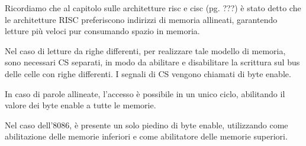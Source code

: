 \documentclass[../template]{subfiles}
\begin{document}
Ricordiamo che al capitolo sulle architetture risc e cisc (pg. ???) è stato detto che le architetture RISC preferiscono indirizzi di memoria allineati, garantendo letture più veloci pur consumando spazio in memoria.

Nel caso di letture da righe differenti, per realizzare tale modello di memoria, sono necessari CS separati, in modo da abilitare e disabilitare la scrittura sul bus delle celle con righe differenti. I segnali di CS vengono chiamati di byte enable.

In caso di parole allineate, l'accesso è possibile in un unico ciclo, abilitando il valore dei byte enable a tutte le memorie.

Nel caso dell'8086, è presente un solo piedino di byte enable, utilizzando  come abilitazione delle memorie inferiori e  come abilitatore delle memorie superiori.

\end{document}
